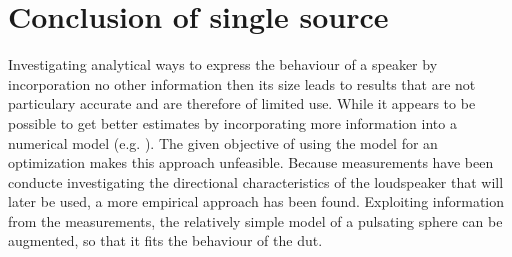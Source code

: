 \section{Conclusion of single source}
Investigating analytical ways to express the behaviour of a speaker by incorporation no other information then its size leads to results that are not particulary accurate and are therefore of limited use. While it appears to be possible to get better estimates by incorporating more information into a numerical model (e.g. \citep{vanderkooy10}). The given objective of using the model for an optimization makes this approach unfeasible. Because measurements have been conducte investigating the directional characteristics of the loudspeaker that will later be used, a more empirical approach has been found. Exploiting information from the measurements, the relatively simple model of a pulsating sphere can be augmented, so that it fits the behaviour of the \gls{dut}.